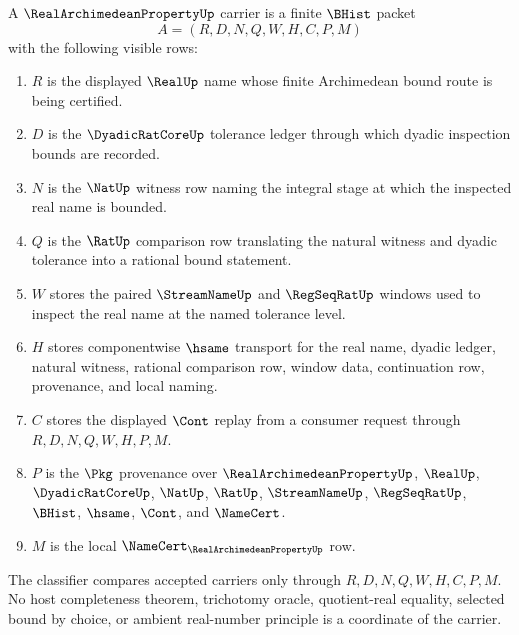 \begin{definition}
\label{def:real-archimedean-property-carrier}
A $\RealArchimedeanPropertyUp$ carrier is a finite $\BHist$ packet
$$
A=(R,D,N,Q,W,H,C,P,M)
$$
with the following visible rows:
\begin{enumerate}
\item $R$ is the displayed $\RealUp$ name whose finite Archimedean bound route is being certified.
\item $D$ is the $\DyadicRatCoreUp$ tolerance ledger through which dyadic inspection bounds are recorded.
\item $N$ is the $\NatUp$ witness row naming the integral stage at which the inspected real name is bounded.
\item $Q$ is the $\RatUp$ comparison row translating the natural witness and dyadic tolerance into a rational bound statement.
\item $W$ stores the paired $\StreamNameUp$ and $\RegSeqRatUp$ windows used to inspect the real name at the named tolerance level.
\item $H$ stores componentwise $\hsame$ transport for the real name, dyadic ledger, natural witness, rational comparison row, window data, continuation row, provenance, and local naming.
\item $C$ stores the displayed $\Cont$ replay from a consumer request through $R,D,N,Q,W,H,P,M$.
\item $P$ is the $\Pkg$ provenance over $\RealArchimedeanPropertyUp$, $\RealUp$, $\DyadicRatCoreUp$, $\NatUp$, $\RatUp$, $\StreamNameUp$, $\RegSeqRatUp$, $\BHist$, $\hsame$, $\Cont$, and $\NameCert$.
\item $M$ is the local $\NameCert_{\RealArchimedeanPropertyUp}$ row.
\end{enumerate}
The classifier compares accepted carriers only through $R,D,N,Q,W,H,C,P,M$. No host completeness theorem, trichotomy oracle, quotient-real equality, selected bound by choice, or ambient real-number principle is a coordinate of the carrier.
\end{definition}

